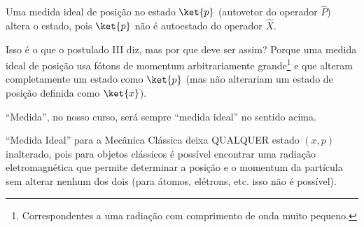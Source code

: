 Uma medida ideal de posição no estado $\ket{p}$ (autovetor do operador $\hat{P}$) altera o estado, pois $\ket{p}$ não é autoestado do operador $\hat{X}$.

Isso é o que o postulado III diz, mas por que deve ser assim? Porque uma medida ideal de posição usa fótons de momentum arbitrariamente grande\footnote{Correspondentes a uma radiação com comprimento de onda muito pequeno.} e que alteram completamente um estado como $\ket{p}$ (mas não alterariam um estado de posição definida como $\ket{x}$).


``Medida'', no nosso curso, será sempre ``medida ideal'' no sentido acima.

``Medida Ideal'' para a Mecânica Clássica deixa QUALQUER estado $(x,p)$ inalterado, pois para objetos clássicos é possível encontrar uma radiação eletromagnética que permite determinar a posição e o momentum da partícula sem alterar nenhum dos dois (para átomos, elétrons, etc. isso não é possível).
